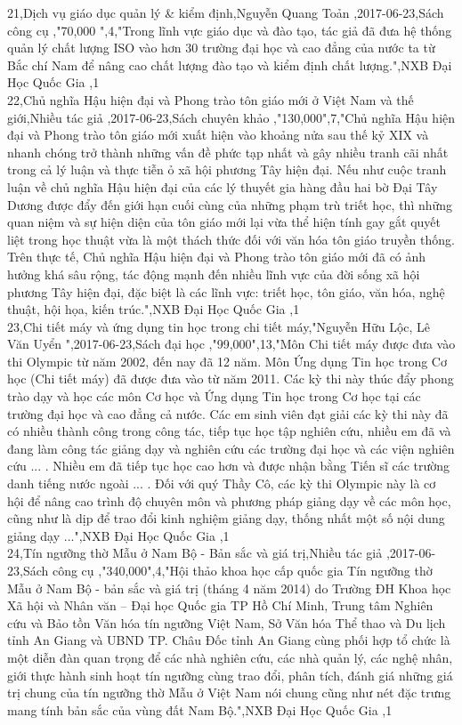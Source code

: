 \documentclass[a4paper]{article}
\begin{document}
21,Dịch vụ giáo dục quản lý \& kiểm định,Nguyễn Quang Toản ,2017-06-23,Sách công cụ ,"70,000 ",4,"Trong lĩnh vực giáo dục và đào tạo, tác giả đã đưa hệ thống quản lý chất lượng ISO vào hơn 30 trường đại học và cao đẳng của nước ta từ Bắc chí Nam để nâng cao chất lượng đào tạo và kiểm định chất lượng.",NXB Đại Học Quốc Gia ,1\\
22,Chủ nghĩa Hậu hiện đại và Phong trào tôn giáo mới ở Việt Nam và thế giới,Nhiều tác giả ,2017-06-23,Sách chuyên khảo ,"130,000",7,"Chủ nghĩa Hậu hiện đại và Phong trào tôn giáo mới xuất hiện vào khoảng nửa sau thế kỷ XIX và nhanh chóng trở thành những vấn đề phức tạp nhất và gây nhiều tranh cãi nhất trong cả lý luận và thực tiễn ỏ xã hội phương Tây hiện đại. Nếu như cuộc tranh luận về chủ nghĩa Hậu hiện đại của các lý thuyết gia hàng đầu hai bờ Đại Tây Dương được đẩy đến giới hạn cuối cùng của những phạm trù triết học, thì những quan niệm và sự hiện diện của tôn giáo mới lại vừa thể hiện tính gay gắt quyết liệt trong học thuật vừa là một thách thức đối với văn hóa tôn giáo truyền thống. Trên thực tế, Chủ nghĩa Hậu hiện đại và Phong trào tôn giáo mới đã có ảnh hưởng khá sâu rộng, tác động mạnh đến nhiều lĩnh vực của đời sống xã hội phương Tây hiện đại, đặc biệt là các lĩnh vực: triết học, tôn giáo, văn hóa, nghệ thuật, hội họa, kiến trúc.",NXB Đại Học Quốc Gia ,1\\
23,Chi tiết máy và ứng dụng tin học trong chi tiết máy,"Nguyễn Hữu Lộc, Lê Văn Uyển ",2017-06-23,Sách đại học ,"99,000",13,"Môn Chi tiết máy được đưa vào thi Olympic từ năm 2002, đến nay đã 12 năm. Môn Ứng dụng Tin học trong Cơ học (Chi tiết máy) đã được đưa vào từ năm 2011. Các kỳ thi này thúc đẩy phong trào dạy và học các môn Cơ học và Ứng dụng Tin học trong Cơ học tại các trường đại học và cao đẳng cả nước. Các em sinh viên đạt giải các kỳ thi này đã có nhiều thành công trong công tác, tiếp tục học tập nghiên cứu, nhiều em đã và đang làm công tác giảng dạy và nghiên cứu các trường đại học và các viện nghiên cứu ... . Nhiều em đã tiếp tục học cao hơn và được nhận bằng Tiến sĩ các trường danh tiếng nước ngoài ... . Đối với quý Thầy Cô, các kỳ thi Olympic này là cơ hội để nâng cao trình độ chuyên môn và phương pháp giảng dạy về các môn học, cũng như là dịp để trao đổi kinh nghiệm giảng dạy, thống nhất một số nội dung giảng dạy ...",NXB Đại Học Quốc Gia ,1\\
24,Tín ngưỡng thờ Mẫu ở Nam Bộ - Bản sắc và giá trị,Nhiều tác giả ,2017-06-23,Sách công cụ ,"340,000",4,"Hội thảo khoa học cấp quốc gia Tín ngưỡng thờ Mẫu ở Nam Bộ - bản sắc và giá trị (tháng 4 năm 2014) do Trường ĐH Khoa học Xã hội và Nhân văn – Đại học Quốc gia TP Hồ Chí Minh, Trung tâm Nghiên cứu và Bảo tồn Văn hóa tín ngưỡng Việt Nam, Sở Văn hóa Thể thao và Du lịch tỉnh An Giang và UBND TP. Châu Đốc tỉnh An Giang cùng phối hợp tổ chức là một diễn đàn quan trọng để các nhà nghiên cứu, các nhà quản lý, các nghệ nhân, giới thực hành sinh hoạt tín ngưỡng cùng trao đổi, phân tích, đánh giá những giá trị chung của tín ngưỡng thờ Mẫu ở Việt Nam nói chung cũng như nét đặc trưng mang tính bản sắc của vùng đất Nam Bộ.",NXB Đại Học Quốc Gia ,1\\
\end{document}
